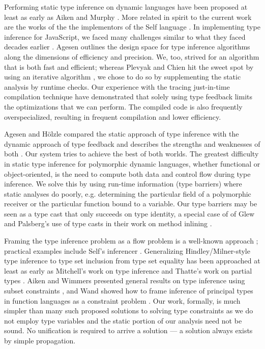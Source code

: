 Performing static type inference on dynamic languages have been proposed at
least as early as Aiken and Murphy \cite{Aiken91}. More related in spirit to
the current work are the works of the the implementors of the Self language
\cite{Ungar87}. In implementing type inference for JavaScript, we faced many
challenges similar to what they faced decades earlier \cite{Ungar92,
  Agesen94}. Agesen outlines the design space for type inference algorithms
along the dimensions of efficiency and precision. We, too, strived for an
algorithm that is both fast and efficient; whereas Plevyak and Chien hit the
sweet spot by using an iterative algorithm \cite{Plevyak93}, we chose to do so
by supplementing the static analysis by runtime checks. Our experience with
the tracing just-in-time compilation technique \cite{GalVEE09, GalPLDI09} have
demonstrated that solely using type feedback limits the optimizations that we
can perform. The compiled code is also frequently overspecialized, resulting
in frequent compilation and lower efficiency.

Agesen and H\"olzle compared the static approach of type inference with the
dynamic approach of type feedback and describes the strengths and weaknesses
of both \cite{Agesen95}. Our system tries to achieve the best of both
worlds. The greatest difficulty in static type inference for polymorphic
dynamic languages, whether functional or object-oriented, is the need to
compute both data and control flow during type inference. We solve this by
using run-time information (type barriers) where static analyses do poorly,
e.g. determining the particular field of a polymorphic receiver or the
particular function bound to a variable. Our type barriers may be seen as a
type cast that only succeeds on type identity, a special case of of Glew and
Palsberg's use of type casts in their work on method inlining \cite{Glew02}.

Framing the type inference problem as a flow problem is a well-known approach
\cite{Oxhoj92, Palsberg91}; practical examples include Self's inferencer
\cite{Agesen93TI}.  Generalizing Hindley/Milner-style type inference to type
set inclusion from type set equality has been approached at least as early as
Mitchell's work on type inference and Thatte's work on partial types
\cite{Mitchell84, Thatte88}. Aiken and Wimmers presented general results on
type inference using subset constraints \cite{Aiken93}, and Wand showed how to
frame inference of principal types in function languages as a constraint
problem \cite{Wand87}. Our work, formally, is much simpler than many such
proposed solutions to solving type constraints as we do not employ type
variables and the static portion of our analysis need not be sound. No
unification is required to arrive a solution --- a solution always exists by
simple propagation.

